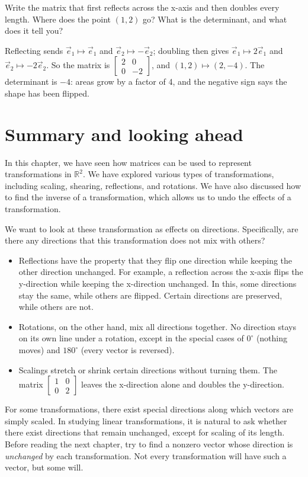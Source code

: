 \begin{Exercise}[title={Build a Matrix}, label={ex:build_matrix}]
Write the matrix that first reflects across the x-axis and then doubles every
length. Where does the point $(1, 2)$ go? What is the determinant, and what
does it tell you?
\end{Exercise}
\begin{Answer}[ref={ex:build_matrix}]
Reflecting sends $\vec e_1 \mapsto \vec e_1$ and $\vec e_2 \mapsto -\vec e_2$;
doubling then gives $\vec e_1 \mapsto 2\vec e_1$ and $\vec e_2 \mapsto
-2\vec e_2$. So the matrix is $\begin{bmatrix} 2 & 0 \\ 0 & -2
\end{bmatrix}$, and $(1, 2) \mapsto (2, -4)$. The determinant is $-4$: areas
grow by a factor of 4, and the negative sign says the shape has been
flipped.
\end{Answer}

\section{Summary and looking ahead}
In this chapter, we have seen how matrices can be used to represent transformations in $\mathbb R^2$. We have explored various types of transformations, including scaling, shearing, reflections, and rotations. We have also discussed how to find the inverse of a transformation, which allows us to undo the effects of a transformation.

We want to look at these transformation as effects on directions. Specifically, are there any directions that this transformation does not mix with others?

\begin{itemize}
    \item Reflections have the property that they flip one direction while keeping the other direction unchanged. For example, a reflection across the x-axis flips the y-direction while keeping the x-direction unchanged. In this, some directions stay the same, while others are flipped. Certain directions are preserved, while others are not.
    \item Rotations, on the other hand, mix all directions together. No direction stays on its own line under a rotation, except in the special cases of $0^\circ$ (nothing moves) and $180^\circ$ (every vector is reversed).
    \item Scalings stretch or shrink certain directions without turning them. The matrix $\begin{bmatrix} 1 & 0 \\ 0 & 2 \end{bmatrix}$ leaves the x-direction alone and doubles the y-direction.
\end{itemize}

For some transformations, there exist special directions along which vectors are simply scaled. In studying linear transformations, it is natural to ask whether there exist directions that remain unchanged, except for scaling of its length. Before reading the next chapter, try to find a nonzero vector whose direction is \emph{unchanged} by each transformation. Not every transformation will have such a vector, but some will. 